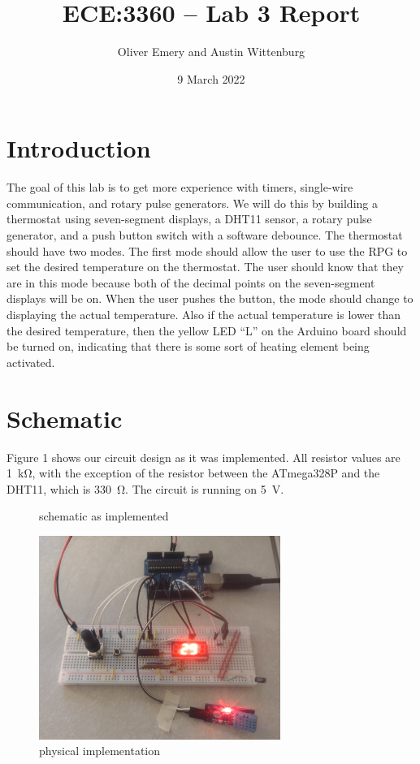 \documentclass[12pt,letterpaper]{article}
\title{ECE:3360 -- Lab 3 Report}
\author{Oliver Emery and Austin Wittenburg}
\date{9 March 2022}
\begin{document}
\maketitle

\section{Introduction}
The goal of this lab is to get more experience with timers, single-wire 
communication, and rotary pulse generators. We will do this by building a 
thermostat using seven-segment displays, a DHT11 sensor, a rotary pulse 
generator, and a push button switch with a software debounce. The thermostat 
should have two modes. The first mode should allow the user to use the RPG to 
set the desired temperature on the thermostat. The user should know that they 
are in this mode because both of the decimal points on the seven-segment 
displays will be on. When the user pushes the button, the mode should change to 
displaying the actual temperature. Also if the actual temperature is lower than 
the desired temperature, then the yellow LED ``L'' on the Arduino board 
should be turned on, indicating that there is some sort of heating element 
being activated.

\section{Schematic}
Figure 1 shows our circuit design as it was implemented. All resistor values are
\SI{1}{\kilo\ohm}, with the exception of the resistor between the ATmega328P and
the DHT11, which is \SI{330}{\ohm}. The circuit is running on \SI{5}{V}.

\begin{figure}[H]
	\centering
	
	\caption{schematic as implemented}
\end{figure}
\begin{figure}[H]
	\centering
	\includegraphics[width=0.7\textwidth]{breadboard.jpg}
	\caption{physical implementation}
\end{figure}
\end{document}
